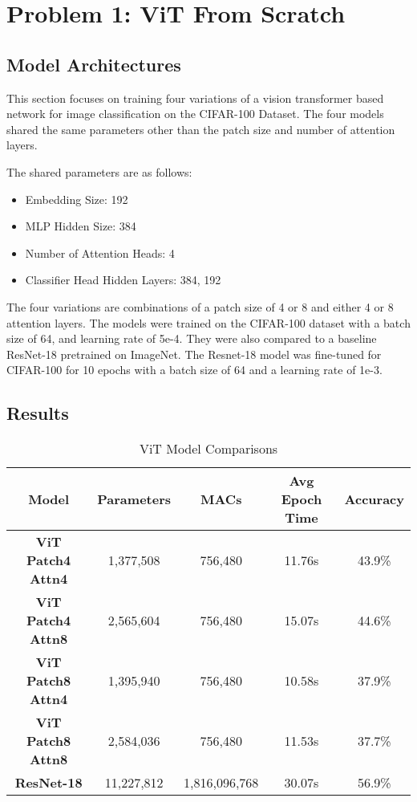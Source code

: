\documentclass{article}
\begin{document}

\raggedright

\section{Problem 1: ViT From Scratch}
\subsection{Model Architectures}
This section focuses on training four
variations of a vision transformer based
network for image classification on the
CIFAR-100 Dataset. The four models shared the
same parameters other than the patch size and
number of attention layers.

The shared parameters are as follows:
\begin{itemize}
    \item Embedding Size: 192
    \item MLP Hidden Size: 384
    \item Number of Attention Heads: 4
    \item Classifier Head Hidden Layers: 384, 192
\end{itemize}
The four variations are combinations of a
patch size of 4 or 8 and either 4 or 8
attention layers. The models were trained on
the CIFAR-100 dataset with a batch size of
64, and learning rate of 5e-4. They were also
compared to a baseline ResNet-18 pretrained
on ImageNet.  The Resnet-18 model was
fine-tuned for CIFAR-100 for 10 epochs with a
batch size of 64 and a learning rate of 1e-3.

\subsection{Results}
\begin{table}[h]
    \centering %
    \begin{tabular}{|c|c|c|c|c|}
        \hline
        \textbf{Model} & \textbf{Parameters} & \textbf{MACs} & \textbf{Avg Epoch Time} & \textbf{Accuracy}  \\
        \hline
        \textbf{ViT Patch4 Attn4} & 1,377,508 & 756,480 & 11.76s & 43.9\% \\
        \hline
        \textbf{ViT Patch4 Attn8} & 2,565,604 & 756,480 & 15.07s & 44.6\% \\
        \hline
        \textbf{ViT Patch8 Attn4} & 1,395,940 & 756,480 & 10.58s & 37.9\% \\
        \hline
        \textbf{ViT Patch8 Attn8} & 2,584,036 & 756,480 & 11.53s & 37.7\% \\
        \hline
        \textbf{ResNet-18} & 11,227,812 & 1,816,096,768 & 30.07s & 56.9\% \\
    \end{tabular}
    \caption{ViT Model Comparisons}
    \label{tab:complexities}
\end{table}
\end{document}
